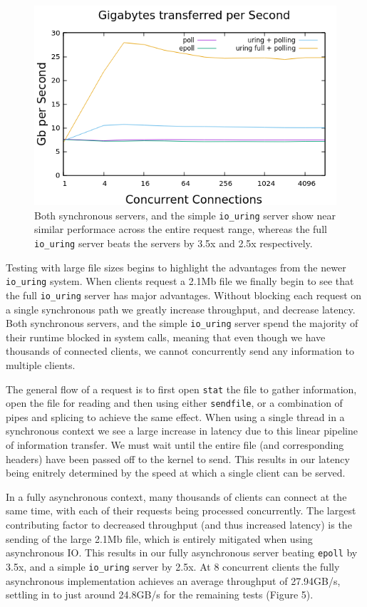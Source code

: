 \documentclass[letterpaper, 10pt, twocolumn]{article}
\begin{document}
\begin{figure}
\centering
\includegraphics[width=4.5in]{gbps.png}
\caption{Both synchronous servers, and the simple \texttt{io\_uring} server show near similar performace across the entire request range, whereas the full \texttt{io\_uring} server beats the servers by 3.5x and 2.5x respectively.}
\end{figure}

Testing with large file sizes begins to highlight the advantages from the newer \texttt{io\_uring} system. When clients request a 2.1Mb file we finally begin to see that the full \texttt{io\_uring} server has major advantages. Without blocking each request on a single synchronous path we greatly increase throughput, and decrease latency. Both synchronous servers, and the simple \texttt{io\_uring} server spend the majority of their runtime blocked in system calls, meaning that even though we have thousands of connected clients, we cannot concurrently send any information to multiple clients.

The general flow of a request is to first open \texttt{stat} the file to gather information, open the file for reading and then using either \texttt{sendfile}, or a combination of pipes and splicing to achieve the same effect. When using a single thread in a synchronous context we see a large increase in latency due to this linear pipeline of information transfer. We must wait until the entire file (and corresponding headers) have been passed off to the kernel to send. This results in our latency being enitrely determined by the speed at which a single client can be served.

In a fully asynchronous context, many thousands of clients can connect at the same time, with each of their requests being processed concurrently. The largest contributing factor to decreased throughput (and thus increased latency) is the sending of the large 2.1Mb file, which is entirely mitigated when using asynchronous IO. This results in our fully asynchronous server beating \texttt{epoll} by 3.5x, and a simple \texttt{io\_uring} server by 2.5x. At 8 concurrent clients the fully asynchronous implementation achieves an average throughput of 27.94GB/s, settling in to just around 24.8GB/s for the remaining tests (Figure 5).
\end{document}
